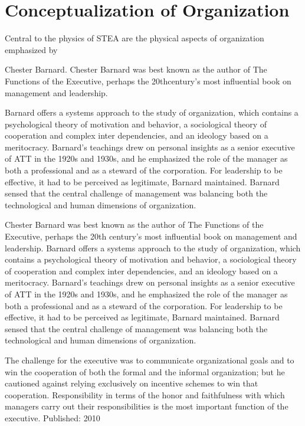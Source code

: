 \section{Conceptualization of Organization}

Central to the physics of  STEA are the physical aspects of organization emphasized by 

Chester Barnard. Chester Barnard was best known as the author of The Functions of the Executive, perhaps the 20thcentury’s most influential book on management and leadership. 

Barnard offers a systems approach to the study of organization, which contains a psychological theory of motivation and behavior, a sociological theory of cooperation and complex inter dependencies, and an ideology based on a meritocracy. Barnard’s teachings drew on personal insights as a senior executive of ATT in the 1920s and 1930s, and he emphasized the role of the manager as both a professional and as a steward of the corporation. For leadership to be effective, it had to be perceived as legitimate, Barnard maintained. Barnard sensed that the central challenge of management was balancing both the technological and human dimensions of organization.

Chester Barnard was best known as the author of The Functions of the Executive, perhaps the 20th century’s most influential book on management and leadership. Barnard offers a systems approach to the study of organization, which contains a psychological theory of motivation and behavior, a sociological theory of cooperation and complex inter dependencies, and an ideology based on a meritocracy. Barnard’s teachings drew on personal insights as a senior executive of ATT in the 1920s and 1930s, and he emphasized the role of the manager as both a professional and as a steward of the corporation. For leadership to be effective, it had to be perceived as legitimate, Barnard maintained. Barnard sensed that the central challenge of management was balancing both the technological and human dimensions of organization.

The challenge for the executive was to communicate organizational goals and to win the cooperation of both the formal and the informal organization; but he cautioned against relying exclusively on incentive schemes to win that cooperation. Responsibility in terms of the honor and faithfulness with which managers carry out their responsibilities is the most important function of the executive. Published: 2010

